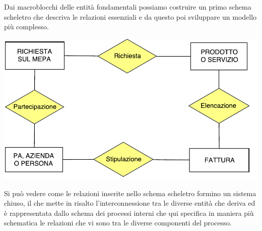 Dai macroblocchi delle entità fondamentali possiamo costruire un primo schema scheletro che descriva le relazioni essenziali e da questo poi sviluppare un modello più complesso.\newline



\includegraphics[width=0.7\linewidth]{./immagini/schema_scheletro.pdf}

\newline
Si può vedere come le relazioni inserite nello schema scheletro formino un sistema chiuso, il che mette in risalto l'interconnessione tra le diverse entità che deriva ed è rappresentata dallo schema dei processi interni che qui specifica in maniera più schematica le relazioni che vi sono tra le diverse componenti del processo.